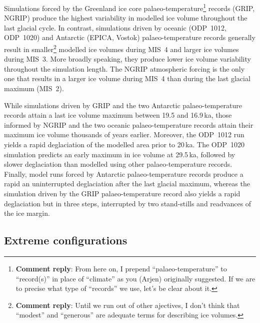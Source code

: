 \documentclass[tc, manuscript]{copernicus}
\newcommand{\renote}[1]{\footnote{\textbf{Comment reply}: #1}}
\begin{document}
Simulations forced by the Greenland ice core palaeo-temperature\renote{
    From here on, I prepend ``palaeo-temperature'' to ``record(s)'' in place of
    ``climate'' as you (Arjen) originally suggested. If we are to precise what
    type of ``records'' we use, let's be clear about it.}
records (GRIP, NGRIP) produce the highest variability in modelled ice volume
throughout the last glacial cycle. In contrast, simulations driven by oceanic
(ODP~1012, ODP~1020) and Antarctic (EPICA, Vostok) palaeo-temperature records
generally result in smaller\renote{
    Until we run out of other ajectives, I don't think that ``modest'' and
    ``generous'' are adequate terms for describing ice volumes.}
modelled ice volumes during MIS~4 and larger ice volumes during MIS~3.
More broadly speaking, they produce lower ice volume variability
throughout the simulation length. The NGRIP atmospheric forcing is the only one
that results in a larger ice volume during MIS~4 than during the last glacial
maximum (MIS~2).

While simulations driven by GRIP and the two Antarctic palaeo-temperature
records attain a last ice volume maximum between 19.5 and 16.9\,ka, those
informed by NGRIP and the two oceanic palaeo-temperature records attain their
maximum ice volume thousands of years earlier. Moreover, the ODP~1012 run
yields a rapid deglaciation of the modelled area prior to 20\,ka. The ODP~1020
simulation predicts an early maximum in ice volume at 29.5\,ka, followed by
slower deglaciation than modelled using other palaeo-temperature records.
Finally, model runs forced by Antarctic palaeo-temperature records produce a
rapid an uninterrupted deglaciation after the last glacial maximum, whereas the
simulation driven by the GRIP palaeo-temperature record also yields a rapid
deglaciation but in three steps, interrupted by two stand-stills and readvances
of the ice margin.

\subsection{Extreme configurations}
\end{document}
